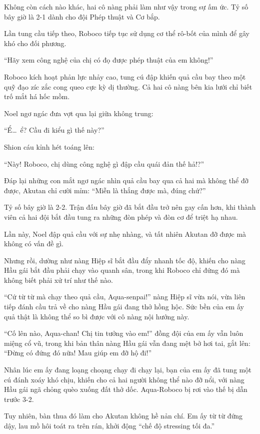 \documentclass[../main.tex]{subfiles}
\begin{document}
Không còn cách nào khác, hai cô nàng phải làm như vậy trong sự ấm ức. Tỷ số bây giờ là 2-1 dành cho đội Phép thuật và Cơ bắp.

Lần tung cầu tiếp theo, Roboco tiếp tục sử dụng cơ thể rô-bốt của mình để gây khó cho đối phương.

``Hãy xem công nghệ của chị có đọ được phép thuật của em không!''

Roboco kích hoạt phản lực nhảy cao, tung cú đập khiến quả cầu bay theo một quỹ đạo zíc zắc cong queo cực kỳ dị thường. Cả hai cô nàng bên kia lưới chỉ biết trố mắt há hốc mồm.

Noel ngơ ngác đưa vợt qua lại giữa không trung:

``Ể\dots\ ể? Cầu đi kiểu gì thế này?''

Shion cáu kỉnh hét toáng lên:

``Này! Roboco, chị dùng công nghệ gì đập cầu quái đản thế hả!?''

Đáp lại những con mắt ngơ ngác nhìn quả cầu bay qua cả hai mà không thể đỡ được, Akutan chỉ cười mỉm: ``Miễn là thắng được mà, đúng chứ?''

Tỷ số bây giờ là 2-2. Trận đấu bây giờ đã bắt đầu trở nên gay cấn hơn, khi thành viên cả hai đội bắt đầu tung ra những đòn phép và đòn cơ để triệt hạ nhau.

Lần này, Noel đập quả cầu với sự nhẹ nhàng, và tất nhiên Akutan đỡ được mà không có vấn đề gì.

Nhưng rồi, dường như nàng Hiệp sĩ bắt đầu đẩy nhanh tốc độ, khiến cho nàng Hầu gái bắt đầu phải chạy vào quanh sân, trong khi Roboco chỉ đứng đó mà không biết phải xử trí như thế nào.

``Cứ từ từ mà chạy theo quả cầu, Aqua-senpai!'' nàng Hiệp sĩ vừa nói, vừa liên tiếp đánh cầu trả về cho nàng Hầu gái đang thở hồng hộc. Sức bền của em ấy quả thật là không thể so bì được với cô nàng nội hướng này.

``Cố lên nào, Aqua-chan! Chị tin tưởng vào em!'' đồng đội của em ấy vẫn luôn miệng cổ vũ, trong khi bản thân nàng Hầu gái vẫn đang mệt bở hơi tai, gắt lên: ``Đừng có đứng đó nữa! Mau giúp em đỡ hộ đi!''

Nhân lúc em ấy đang loạng choạng chạy đi chạy lại, bạn của em ấy đã tung một cú đánh xoáy khó chịu, khiến cho cả hai người không thể nào đỡ nổi, với nàng Hầu gái ngã chỏng quèo xuống đất thở dốc. Aqua-Roboco bị rơi vào thế bị dẫn trước 3-2.

Tuy nhiên, bàn thua đó làm cho Akutan không hề nản chí. Em ấy từ từ đứng dậy, lau mồ hôi toát ra trên rán, khởi động ``chế độ stressing tối đa.''
\end{document}
